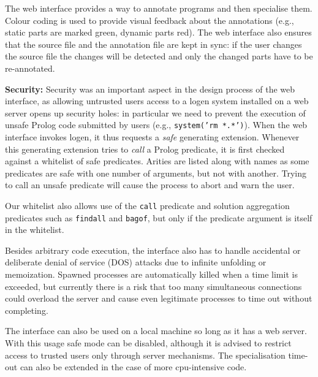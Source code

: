 \documentclass{sig-alternate}
\begin{document}
The web interface
provides a way to annotate programs and then specialise them. 
Colour coding is used to provide visual feedback about the annotations
 (e.g., static parts are marked green, dynamic parts red).
 The web interface also ensures that the source file and
 the annotation file are kept in sync: if the user changes the source file the changes
  will be detected and only the changed parts have to be re-annotated.
  
{\bf Security:}
Security was an important aspect in the design process of the web interface,
 as allowing untrusted users access to a {\sc logen} system installed on a web server 
 opens up security holes: in particular we need to prevent the execution of unsafe
  Prolog code
  submitted by users (e.g., {\tt\small system('rm *.*')}).
When the web interface invokes {\sc logen}, it thus requests a
\emph{safe} generating extension. Whenever this generating extension tries to
\emph{call} a Prolog predicate, it is first checked against a whitelist of safe
predicates. Arities are listed along with names as some predicates are safe
with one number of arguments, but not with another. Trying to call an unsafe predicate
will cause the process to abort and warn the user.

Our whitelist also allows use of the \texttt{call} predicate and solution
aggregation predicates such as \texttt{findall} and \texttt{bagof}, but only
if the predicate argument is itself in the whitelist.

Besides arbitrary code execution, the interface also has to handle accidental
or deliberate denial of service (DOS) attacks due to infinite unfolding or
memoization. Spawned processes are automatically killed when a time limit is
exceeded, but currently there is a risk that too many simultaneous
connections could overload the server and cause even legitimate processes to
time out without completing.

The interface can also be used on a local machine so long as it has a web
server. With this usage safe mode can be disabled, although it is advised
to restrict access to trusted users only through server mechanisms. The 
specialisation time-out can also be extended in the case of more cpu-intensive
code.
\end{document}
